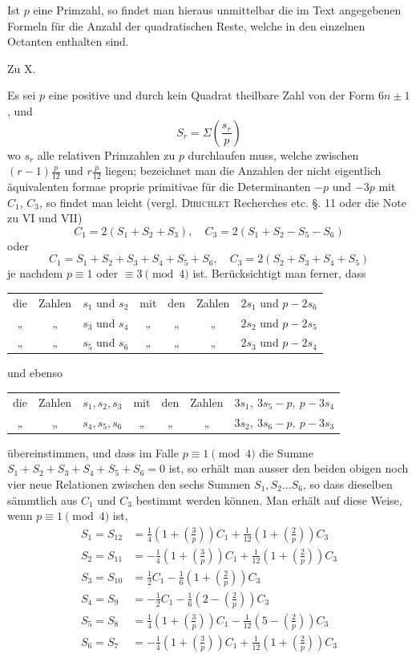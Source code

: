 Ist $p$ eine Primzahl, so findet man hieraus unmittelbar die im Text angegebenen Formeln für die Anzahl der quadratischen Reste, welche in den einzelnen Octanten enthalten sind.
\BookRule{35mm}

\begin{center}\large Zu X.\end{center}

Es sei $p$ eine positive und durch kein Quadrat theilbare Zahl von der Form $6n\pm1$, und
\[
S_r=\Sigma\left(\frac{s_r}p\right)
\]
wo $s_r$ alle relativen Primzahlen zu $p$ durchlaufen muss, welche zwischen $(r-1)\frac p{12}$ und $r\frac p{12}$ liegen; bezeichnet man die Anzahlen der nicht eigentlich äquivalenten formae proprie primitivae für die Determinanten $-p$ und $-3p$ mit $C_1$, $C_3$, so findet man leicht (vergl. \textsc{Dirichlet} Recherches etc. §. 11 oder die Note zu VI und VII)
\[
C_1=2(S_1+S_2+S_3),\quad C_3=2(S_1+S_2-S_5-S_6)
\]
oder
\[
C_1=S_1+S_2+S_3+S_4+S_5+S_6,\quad C_3=2(S_2+S_3+S_4+S_5)
\]
je nachdem $p\equiv1$ oder $\equiv3\pmod4$ ist. Berücksichtigt man ferner, dass
\begin{center}\small
\begin{tabular}{@{}ccccccl@{}}
die&Zahlen&$s_1$ und $s_2$&mit&den&Zahlen&$2s_1$ und $p-2s_6$\\
„&„&$s_3$ und $s_4$&„&„&„&$2s_2$ und $p-2s_5$\\
„&„&$s_5$ und $s_6$&„&„&„&$2s_3$ und $p-2s_4$
\end{tabular}
\end{center}
und ebenso
\begin{center}\small
\begin{tabular}{@{}ccccccl@{}}
die&Zahlen&$s_1,s_2,s_3$&mit&den&Zahlen&$3s_1,\ 3s_5-p,\ p-3s_4$\\
„&„&$s_4,s_5,s_6$&„&„&„&$3s_2,\ 3s_6-p,\ p-3s_3$
\end{tabular}
\end{center}
übereinstimmen, und dass im Falle $p\equiv1\pmod4$ die Summe $S_1+S_2+S_3+S_4+S_5+S_6=0$ ist, so erhält man ausser den beiden obigen noch vier neue Relationen zwischen den sechs Summen $S_1,S_2\ldots S_6$, so dass dieselben sämmtlich aus $C_1$ und $C_3$ bestimmt werden können. Man erhält auf diese Weise, wenn $p\equiv1\pmod4$ ist,
%
\[
\begin{aligned}
S_1=S_{12}&=\tfrac14\left(1+\left(\frac3p\right)\right)C_1+\tfrac1{12}\left(1+\left(\frac2p\right)\right)C_3\\
S_2=S_{11}&=-\tfrac14\left(1+\left(\frac3p\right)\right)C_1+\tfrac1{12}\left(1+\left(\frac2p\right)\right)C_3\\
S_3=S_{10}&=\tfrac12C_1-\tfrac16\left(1+\left(\frac2p\right)\right)C_3\\
S_4=S_9&=-\tfrac12C_1-\tfrac16\left(2-\left(\frac2p\right)\right)C_3\\
S_5=S_8&=\tfrac14\left(1+\left(\frac3p\right)\right)C_1-\tfrac1{12}\left(5-\left(\frac2p\right)\right)C_3\\
S_6=S_7&=-\tfrac14\left(1+\left(\frac3p\right)\right)C_1+\tfrac1{12}\left(1+\left(\frac2p\right)\right)C_3
\end{aligned}
\]
